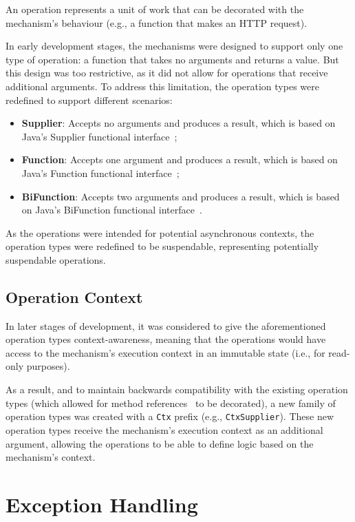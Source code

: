 An operation represents a unit of work that can be decorated with the mechanism's behaviour (e.g., a function that makes an HTTP request).

In early development stages, the mechanisms were designed to support only one type of operation:
a function that takes no arguments and returns a value.
But this design was too restrictive, as it did not allow for operations that receive additional arguments.
To address this limitation, the operation types were redefined to support different scenarios:

\begin{itemize}
    \item \textbf{Supplier}: Accepts no arguments and produces a result, which is based on Java's Supplier functional interface~\cite{java-supplier};
    \item \textbf{Function}: Accepts one argument and produces a result, which is based on Java's Function functional interface~\cite{java-function};
    \item \textbf{BiFunction}: Accepts two arguments and produces a result, which is based on Java's BiFunction functional interface~\cite{java-bifunction}.
\end{itemize}

As the operations were intended for potential asynchronous contexts, the operation types were redefined to be suspendable, representing potentially suspendable operations.

\subsection{Operation Context}\label{subsec:operation-context}

In later stages of development, it was considered to give the aforementioned operation types context-awareness,
meaning that the operations would have access to the mechanism's execution context in an immutable state
(i.e., for read-only purposes).

As a result, and to maintain backwards compatibility with the existing operation types (which allowed for method references~\cite{java-method-references} to be decorated), a new family of operation types was created with a \texttt{Ctx} prefix (e.g., \texttt{CtxSupplier}).
These new operation types receive the mechanism's execution context as an additional argument,
allowing the operations to be able to define logic based on the mechanism's context.


\section{Exception Handling}\label{sec:exception-handling}

